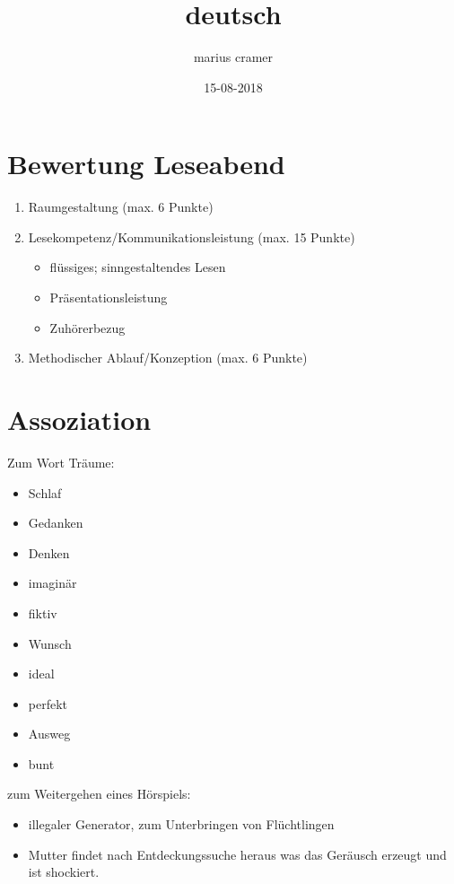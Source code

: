 \documentclass{article}
\title{deutsch}
\author{marius cramer}
\date{15-08-2018}
\begin{document}
\maketitle

\tableofcontents

\newpage

\section{Bewertung Leseabend}
\begin{enumerate}
  \item Raumgestaltung (max. 6 Punkte)
  \item Lesekompetenz/Kommunikationsleistung (max. 15 Punkte)
  \begin{itemize}
    \item flüssiges; sinngestaltendes Lesen
    \item Präsentationsleistung
    \item Zuhörerbezug
  \end{itemize}
  \item Methodischer Ablauf/Konzeption (max. 6 Punkte)
\end{enumerate}

\section{Assoziation}
Zum Wort Träume:
\begin{itemize}
  \item Schlaf
  \item Gedanken
  \item Denken
  \item imaginär
  \item fiktiv
  \item Wunsch
  \item ideal
  \item perfekt
  \item Ausweg
  \item bunt
\end{itemize}

\medskip

\medskip

zum Weitergehen eines Hörspiels:
\begin{itemize}
  \item illegaler Generator, zum Unterbringen von Flüchtlingen
  \item Mutter findet nach Entdeckungssuche heraus was das Geräusch erzeugt und ist shockiert.
\end{itemize}
\end{document}
